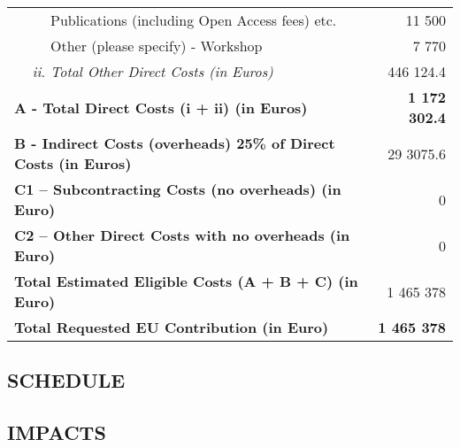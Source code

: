 \begin{table}[!ht]
\begin{tabular}{|l|l|l|r|}
                                        &                                                                                              & Publications (including Open Access fees) etc. & 11 500                   \\ \cline{3-4}
                                        &                                                                                              & Other (please specify) - Workshop                         & 7 770                    \\ \cline{2-4}
                                        & \multicolumn{2}{l|}{\textit{ii. Total Other Direct Costs (in Euros)}}                                                                         & 446 124.4                \\ \hline
\multicolumn{3}{|l|}{\textbf{A - Total Direct Costs (i + ii) (in Euros)}}                                                                                                               & \textbf{1 172 302.4}      \\ \hline
\multicolumn{3}{|l|}{\textbf{B - Indirect Costs (overheads) 25\% of Direct Costs (in Euros)}}                                                                                           & 29 3075.6              \\ \hline
\multicolumn{3}{|l|}{\textbf{C1 – Subcontracting Costs (no overheads) (in Euro)}}                                                                                                       & 0                       \\ \hline
\multicolumn{3}{|l|}{\textbf{C2 – Other Direct Costs with no overheads (in Euro)}}                                                                                                      & 0                       \\ \hline
\multicolumn{3}{|l|}{\textbf{Total Estimated Eligible Costs (A + B + C) (in Euro)}}                                                                                                     &     1 465 378                    \\ \hline
\multicolumn{3}{|l|}{\textbf{Total Requested EU Contribution (in Euro)}}                                                                                                                & {\bf 1 465 378}             \\ \hline
\end{tabular}
\end{table}

\lipsum[2]
\clearpage

\subsection{SCHEDULE}

\lipsum[2]

\subsection{IMPACTS}
\lipsum[2]

\begingroup

{
\begin{multicols}{2}

\end{multicols}
}
\endgroup


